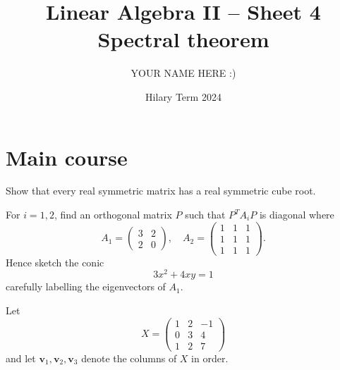 \documentclass[answers]{exam}
\title{Linear Algebra II -- Sheet 4\\Spectral theorem}
\author{YOUR NAME HERE :)}
\date{Hilary Term 2024}
\begin{document}
\maketitle
\section*{Main course}
\begin{questions}

\question%
Show that every real symmetric matrix has a real symmetric cube root.



\question%
For $i=1,2$, find an orthogonal matrix $P$ such that $P^{T} A_{i} P$ is diagonal where \[
	A_{1}=\begin{pmatrix}
		3 & 2 \\
		2 & 0
	\end{pmatrix}, \quad A_{2}=\begin{pmatrix}
		1 & 1 & 1 \\
		1 & 1 & 1 \\
		1 & 1 & 1
	\end{pmatrix}.
\] Hence sketch the conic \[
	3 x^{2}+4 x y=1
\] carefully labelling the eigenvectors of $A_{1}$.



\question%
Let \[
	X=\begin{pmatrix}
		1 & 2 & -1 \\
		0 & 3 & 4 \\
		1 & 2 & 7
	\end{pmatrix}
\] and let $\mathbf{v}_{1}, \mathbf{v}_{2}, \mathbf{v}_{3}$ denote the columns of $X$ in order.
\end{questions}
\end{document}

